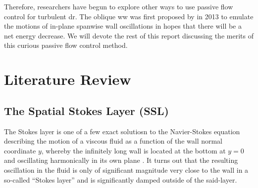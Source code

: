 Therefore, researchers have begun to explore other ways to use passive flow control for turbulent \gls{dr}. The oblique \gls{ww} was first proposed by \textcite{chernyshenko2013} in 2013 to emulate the motions of in-plane spanwise wall oscillations in hopes that there will be a net energy decrease. We will devote the rest of this report discussing the merits of this curious passive flow control method.


\section{Literature Review}
\subsection{The Spatial Stokes Layer (SSL)}%
The Stokes layer is one of a few exact solutiosn to the Navier-Stokes equation describing the motion of a viscous fluid as a function of the wall normal coordinate $y$, whereby the infinitely long wall is located at the bottom at $y=0$ and oscillating harmonically in its own plane \cite{schlichting2017}. It turns out that the resulting oscillation in the fluid is only of significant magnitude very close to the wall in a so-called ``Stokes layer'' and is significantly damped outside of the said-layer.

